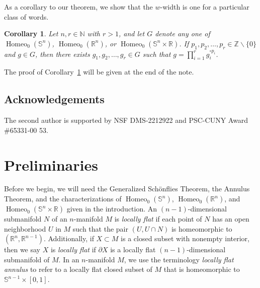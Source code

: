 \documentclass[microtype]{gtpart}
\newcommand{\br}{\mathbb{R}}
\newcommand{\bz}{\mathbb Z}
\newcommand{\bn}{\mathbb N}
\newcommand{\ssm}{\smallsetminus}
\DeclareMathOperator{\Homeo}{Homeo}
\newtheorem{Cor*}{Corollary}
\theoremstyle{definition}
\numberwithin{equation}{section}
\newcommand{\nv}[1]{\color{Cerulean}  \{NV: #1\}\color{black}}
\begin{document}


As a corollary to our theorem, we show that the \( w \)-width is one for a particular class of words.

\begin{Cor*}
\label{cor:2}
Let \( n, r \in \bn \) with \( r > 1 \), and let \( G \) denote any one of \( \Homeo_0(\mathbb S^n) \), \( \Homeo_0(\br^n) \), or \( \Homeo_0(\mathbb S^n \times \br) \).
If \( p_1, p_2, \ldots, p_r \in \bz \ssm \{0\} \) and \( g \in G \), then there exists \( g_1, g_2, \ldots, g_r \in G \) such that \( g = \prod_{i=1}^r g_i^{\circ p_i} \). %
\end{Cor*}

The proof of Corollary~\ref{cor:2} will be given at the end of the note. 


\subsection*{Acknowledgements}
The second author is supported by NSF DMS-2212922 and PSC-CUNY Award \#65331-00 53.




\section{Preliminaries}

Before we begin, we will need the Generalized Sch\"onflies Theorem, the Annulus Theorem, and the characterizations of \( \Homeo_0(\mathbb S^n)\), \( \Homeo_0(\mathbb R^n) \), and \( \Homeo_0(\mathbb S^n \times \br) \)  given in the introduction.
An \( (n-1) \)-dimensional submanifold \( N \) of an \( n \)-manifold \( M \) is \emph{locally flat} if each point of \( N \) has an open neighborhood \( U \) in \( M \) such that the pair \( (U, U \cap N) \) is homeomorphic to \( (\br^n, \br^{n-1}) \).
Additionally, if  \( X \subset M \) is a closed subset with nonempty interior, then we say \( X \) is \emph{locally flat} if \( \partial X \) is a locally flat \( (n-1) \)-dimensional submanifold of \( M \).
In an \( n \)-manifold \( M \), we use the terminology \emph{locally flat annulus} to refer to a locally flat closed subset of \( M \) that is homeomorphic to \( \mathbb S^{n-1} \times [0,1] \). 
\end{document}
